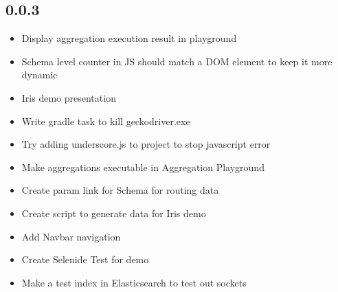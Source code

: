 \documentclass[12pt]{report}
\begin{document}
\subsection*{0.0.3}
\begin{itemize}
\item Display aggregation execution result in playground
\item Schema level counter in JS should match a DOM element to keep it more dynamic
\item Iris demo presentation
\item Write gradle task to kill geckodriver.exe
\item Try adding underscore.js to project to stop javascript error
\item Make aggregations executable in Aggregation Playground
\item Create param link for Schema for routing data
\item Create script to generate data for Iris demo
\item Add Navbar navigation
\item Create Selenide Test for demo
\item Make a test index in Elasticsearch to test out sockets
\end{itemize}
\end{document}
